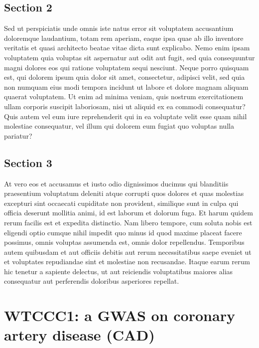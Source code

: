 \documentclass[
]{book}
\begin{document}
\hypertarget{section-2}{%
\section{Section 2}\label{section-2}}

Sed ut perspiciatis unde omnis iste natus error sit voluptatem accusantium doloremque laudantium, totam rem aperiam, eaque ipsa quae ab illo inventore veritatis et quasi architecto beatae vitae dicta sunt explicabo. Nemo enim ipsam voluptatem quia voluptas sit aspernatur aut odit aut fugit, sed quia consequuntur magni dolores eos qui ratione voluptatem sequi nesciunt. Neque porro quisquam est, qui dolorem ipsum quia dolor sit amet, consectetur, adipisci velit, sed quia non numquam eius modi tempora incidunt ut labore et dolore magnam aliquam quaerat voluptatem. Ut enim ad minima veniam, quis nostrum exercitationem ullam corporis suscipit laboriosam, nisi ut aliquid ex ea commodi consequatur? Quis autem vel eum iure reprehenderit qui in ea voluptate velit esse quam nihil molestiae consequatur, vel illum qui dolorem eum fugiat quo voluptas nulla pariatur?

\hypertarget{section-3}{%
\section{Section 3}\label{section-3}}

At vero eos et accusamus et iusto odio dignissimos ducimus qui blanditiis praesentium voluptatum deleniti atque corrupti quos dolores et quas molestias excepturi sint occaecati cupiditate non provident, similique sunt in culpa qui officia deserunt mollitia animi, id est laborum et dolorum fuga. Et harum quidem rerum facilis est et expedita distinctio. Nam libero tempore, cum soluta nobis est eligendi optio cumque nihil impedit quo minus id quod maxime placeat facere possimus, omnis voluptas assumenda est, omnis dolor repellendus. Temporibus autem quibusdam et aut officiis debitis aut rerum necessitatibus saepe eveniet ut et voluptates repudiandae sint et molestiae non recusandae. Itaque earum rerum hic tenetur a sapiente delectus, ut aut reiciendis voluptatibus maiores alias consequatur aut perferendis doloribus asperiores repellat.

\hypertarget{wtccc1-a-gwas-on-coronary-artery-disease-cad}{%
\chapter{WTCCC1: a GWAS on coronary artery disease (CAD)}\label{wtccc1-a-gwas-on-coronary-artery-disease-cad}}
\end{document}
